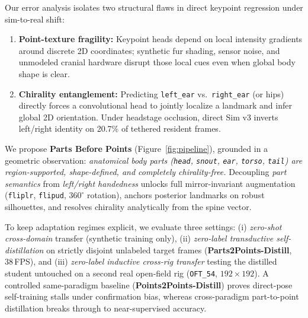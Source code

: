 \documentclass[10pt,twocolumn,letterpaper]{article}
\begin{document}
Our error analysis isolates two structural flaws in direct keypoint regression under sim-to-real shift:
\begin{enumerate}[leftmargin=*,itemsep=1pt,topsep=1.5pt]
  \item \textbf{Point-texture fragility:} Keypoint heads depend on local intensity gradients around discrete 2D coordinates; synthetic fur shading, sensor noise, and unmodeled cranial hardware disrupt those local cues even when global body shape is clear.
  \item \textbf{Chirality entanglement:} Predicting \texttt{left\_ear} vs.\ \texttt{right\_ear} (or hips) directly forces a convolutional head to jointly localize a landmark and infer global 2D orientation. Under headstage occlusion, direct Sim v3 inverts left/right identity on 20.7\% of tethered resident frames.
\end{enumerate}

We propose \textbf{Parts Before Points} (Figure~\ref{fig:pipeline}), grounded in a geometric observation: \emph{anatomical body parts (\texttt{head}, \texttt{snout}, \texttt{ear}, \texttt{torso}, \texttt{tail}) are region-supported, shape-defined, and completely chirality-free.} Decoupling \emph{part semantics} from \emph{left/right handedness} unlocks full mirror-invariant augmentation (\texttt{fliplr}, \texttt{flipud}, $360^\circ$ rotation), anchors posterior landmarks on robust silhouettes, and resolves chirality analytically from the spine vector.

To keep adaptation regimes explicit, we evaluate three settings: (i) \emph{zero-shot cross-domain} transfer (synthetic training only), (ii) \emph{zero-label transductive self-distillation} on strictly disjoint unlabeled target frames (\textbf{Parts2Points-Distill}, 38\,FPS), and (iii) \emph{zero-label inductive cross-rig transfer} testing the distilled student untouched on a second real open-field rig (\texttt{OFT\_54}, $192\times 192$). A controlled same-paradigm baseline (\textbf{Points2Points-Distill}) proves direct-pose self-training stalls under confirmation bias, whereas cross-paradigm part-to-point distillation breaks through to near-supervised accuracy.
\end{document}
